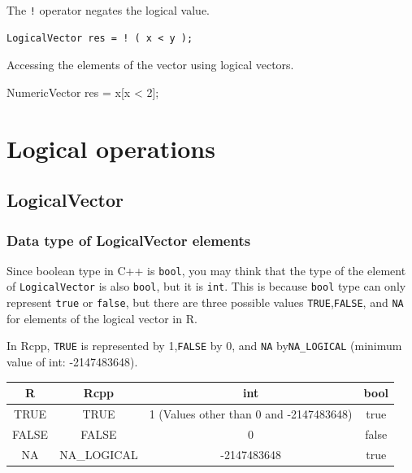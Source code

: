 \documentclass[]{book}
\newenvironment{Shaded}{\begin{snugshade}}{\end{snugshade}}
\newcommand{\DecValTok}[1]{\textcolor[rgb]{0.00,0.00,0.81}{#1}}
\newcommand{\NormalTok}[1]{#1}
\begin{document}
The \texttt{!} operator negates the logical value.

\begin{verbatim}
LogicalVector res = ! ( x < y );
\end{verbatim}

Accessing the elements of the vector using logical vectors.

\begin{Shaded}
\begin{Highlighting}[]
\NormalTok{NumericVector res = x[x < }\DecValTok{2}\NormalTok{];}
\end{Highlighting}
\end{Shaded}

\hypertarget{logical-operations}{%
\chapter{Logical operations}\label{logical-operations}}

\hypertarget{logicalvector}{%
\section{LogicalVector}\label{logicalvector}}

\hypertarget{data-type-of-logicalvector-elements}{%
\subsection{Data type of LogicalVector elements}\label{data-type-of-logicalvector-elements}}

Since boolean type in C++ is \texttt{bool}, you may think that the type of the element of \texttt{LogicalVector} is also \texttt{bool}, but it is \texttt{int}. This is because \texttt{bool} type can only represent \texttt{true} or \texttt{false}, but there are three possible values \texttt{TRUE},\texttt{FALSE}, and \texttt{NA} for elements of the logical vector in R.

In Rcpp, \texttt{TRUE} is represented by 1,\texttt{FALSE} by 0, and \texttt{NA} by\texttt{NA\_LOGICAL} (minimum value of int: -2147483648).

\begin{longtable}[]{@{}cccc@{}}
\toprule
R & Rcpp & int & bool\tabularnewline
\midrule
\endhead
TRUE & TRUE & 1 (Values other than 0 and -2147483648) & true\tabularnewline
FALSE & FALSE & 0 & false\tabularnewline
NA & NA\_LOGICAL & -2147483648 & true\tabularnewline
\bottomrule
\end{longtable}
\end{document}
